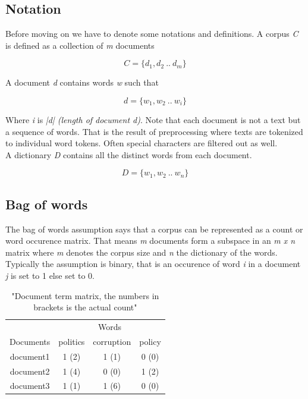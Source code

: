   \subsection{Notation}
    Before moving on we have to denote some notations and definitions. 
    A corpus \emph{C} is defined as a collection of \emph{m} documents

    \begin{equation}
      C = \{d_1, d_2 \: .. \: d_m\}
    \end{equation}

    A document \emph{d} contains words \emph{w} such that
    
    \begin{equation}
      d = \{w_1, w_2 \: .. \: w_i\}
    \end{equation}
    
    Where \emph{i} is \emph{|d| (length of document d)}. Note that each document is not a text but a sequence of words. That is the result of preprocessing where texts are tokenized to individual word tokens. Often special characters are filtered out as well.\\
    A dictionary \emph{D} contains all the distinct words from each document.

    \begin{equation}
      D = \{w_1, w_2 \: .. \: w_n\}
    \end{equation}

  \subsection{Bag of words}
    The bag of words assumption says that a corpus can be represented as a count or word occurence matrix. That means \emph{m} documents form a subspace in an \emph{m x n} matrix where \emph{m} denotes the corpus size and \emph{n} the dictionary of the words. Typically the assumption is binary, that is an occurence of word \emph{i} in a document \emph{j} is set to 1 else set to 0.

    \begin{table}[h!]
      \centering
      \begin{tabular}{c|c|c|c}
        \multicolumn{1}{r|}{} & \multicolumn{3}{c}{Words} \\
        \cline{1-4}
        Documents &   politics &   corruption &  policy  \\
        \hline
        document1 &    1 (2)   &     1 (1)    &   0 (0)  \\
        document2 &    1 (4)   &     0 (0)    &   1 (2)  \\
        document3 &    1 (1)   &     1 (6)    &   0 (0)  \\
      \end{tabular}\\
      \caption{"Document term matrix, the numbers in brackets is the actual count"}
    \end{table}

